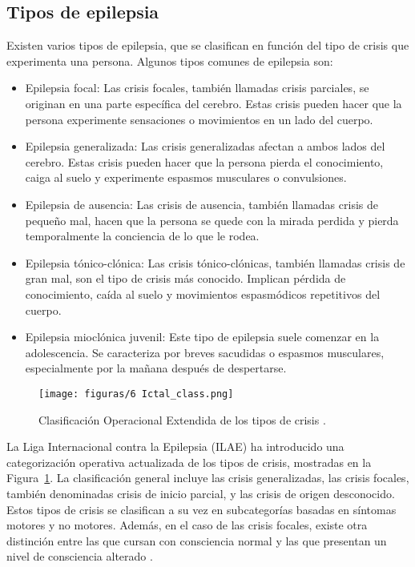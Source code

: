 \subsection{Tipos de epilepsia}
Existen varios tipos de epilepsia, que se clasifican en función del tipo de crisis que experimenta una persona. Algunos tipos comunes de epilepsia son:
\begin{itemize}
    \item Epilepsia focal: Las crisis focales, también llamadas crisis parciales, se originan en una parte específica del cerebro. Estas crisis pueden hacer que la persona experimente sensaciones o movimientos en un lado del cuerpo.
    \item Epilepsia generalizada: Las crisis generalizadas afectan a ambos lados del cerebro. Estas crisis pueden hacer que la persona pierda el conocimiento, caiga al suelo y experimente espasmos musculares o convulsiones.
    \item Epilepsia de ausencia: Las crisis de ausencia, también llamadas crisis de pequeño mal, hacen que la persona se quede con la mirada perdida y pierda temporalmente la conciencia de lo que le rodea.
    \item Epilepsia tónico-clónica: Las crisis tónico-clónicas, también llamadas crisis de gran mal, son el tipo de crisis más conocido. Implican pérdida de conocimiento, caída al suelo y movimientos espasmódicos repetitivos del cuerpo.
    \item Epilepsia mioclónica juvenil: Este tipo de epilepsia suele comenzar en la adolescencia. Se caracteriza por breves sacudidas o espasmos musculares, especialmente por la mañana después de despertarse. 
\end{itemize}

\begin{figure}[t]
    \centering
    \texttt{[image: figuras/6 Ictal\_class.png]}
    \caption{Clasificación Operacional Extendida de los tipos de crisis \cite{Clasificacion_ictal_imag}.}
    \label{fig:clasificacion_ictal_ref_imag}
\end{figure}

La Liga Internacional contra la Epilepsia (ILAE) ha introducido una categorización operativa actualizada de los tipos de crisis, mostradas en la Figura~\ref{fig:clasificacion_ictal_ref_imag}. La clasificación general incluye las crisis generalizadas, las crisis focales, también denominadas crisis de inicio parcial, y las crisis de origen desconocido. Estos tipos de crisis se clasifican a su vez en subcategorías basadas en síntomas motores y no motores. Además, en el caso de las crisis focales, existe otra distinción entre las que cursan con consciencia normal y las que presentan un nivel de consciencia alterado \cite{Clasificacion_ictal_imag}. 

